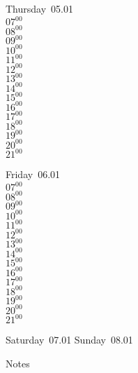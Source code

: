 \documentclass[11pt,a4paper]{book}\usepackage[]{graphicx}\usepackage[]{color}
\begin{document}
\clearpage
\begin{headerbox}
\end{headerbox}
\begin{weekdaybox}
  Thursday~05.01\\
  { 
  \vfill
  $07^{00}$\\
$08^{00}$\\
$09^{00}$\\
$10^{00}$\\
$11^{00}$\\
$12^{00}$\\
$13^{00}$\\
$14^{00}$\\
$15^{00}$\\
$16^{00}$\\
$17^{00}$\\
$18^{00}$\\
$19^{00}$\\
$20^{00}$\\
$21^{00}$\\
  }
\end{weekdaybox} 
\begin{weekdaybox}
  Friday~06.01\\
  { 
  \vfill
  $07^{00}$\\
$08^{00}$\\
$09^{00}$\\
$10^{00}$\\
$11^{00}$\\
$12^{00}$\\
$13^{00}$\\
$14^{00}$\\
$15^{00}$\\
$16^{00}$\\
$17^{00}$\\
$18^{00}$\\
$19^{00}$\\
$20^{00}$\\
$21^{00}$\\
  }
\end{weekdaybox}
\begin{weekendbox}
  Saturday~07.01
  \tcblower
  Sunday~08.01
\end{weekendbox} %
\begin{notebox}
  Notes
\end{notebox}
\clearpage
\end{document}
